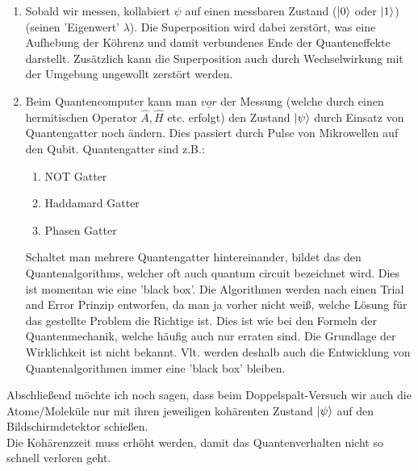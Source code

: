 \begin{enumerate}
    \item Sobald wir messen, kollabiert $\psi$ auf einen messbaren Zustand ($\ket{0}$ oder $\ket{1}$) (seinen 'Eigenwert' $\lambda$). Die Superposition
        wird dabei zerstört, was eine Aufhebung der Köhrenz und damit verbundenes Ende der Quanteneffekte darstellt. Zusätzlich 
        kann die Superposition auch durch Wechselwirkung mit der Umgebung ungewollt zerstört werden.
    \item Beim Quantencomputer kann man $\underline{vor}$ der Messung (welche durch einen hermitischen Operator $\hat{A}, \hat{H}$ etc. erfolgt)
        den Zustand $\ket{\psi}$ durch Einsatz von Quantengatter noch ändern. Dies passiert durch Pulse von Mikrowellen auf den Qubit. 
        Quantengatter sind z.B.:
        \begin{enumerate}
            \item NOT Gatter
            \item Haddamard Gatter 
            \item Phasen Gatter
        \end{enumerate}
        Schaltet man mehrere Quantengatter hintereinander, bildet das den Quantenalgorithms, welcher oft auch quantum circuit
        bezeichnet wird. Dies ist momentan wie eine 'black box'. Die Algorithmen werden nach einen Trial and Error Prinzip entworfen,
        da man ja vorher nicht weiß, welche Lösung für das gestellte Problem die Richtige ist. Dies ist wie bei den Formeln der Quantenmechanik, 
        welche häufig auch nur erraten sind. Die Grundlage der Wirklichkeit ist nicht bekannt. Vlt. werden deshalb auch die Entwicklung von
        Quantenalgorithmen immer eine 'black box' bleiben. 
\end{enumerate}
Abschließend möchte ich noch sagen, dass beim Doppelspalt-Versuch wir auch die Atome/Moleküle nur mit ihren jeweiligen 
kohärenten Zustand $\ket{\psi}$ auf den Bildschirmdetektor schießen.\\
Die Kohärenzzeit muss erhöht werden, damit das Quantenverhalten nicht so schnell verloren geht.


